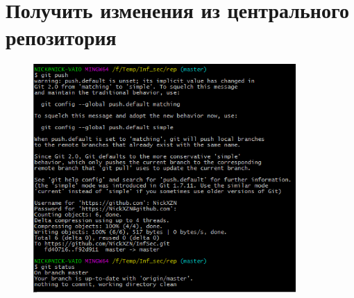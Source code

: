 \documentclass[utf8x, 12pt]{G7-32}
\begin{document}
\section{Получить изменения из центрального репозитория}

\begin{figure}[hhh!]
	\begin{center}
		\includegraphics[width=10cm]{img/8}
	\end{center}
\end{figure}	
\end{document}

